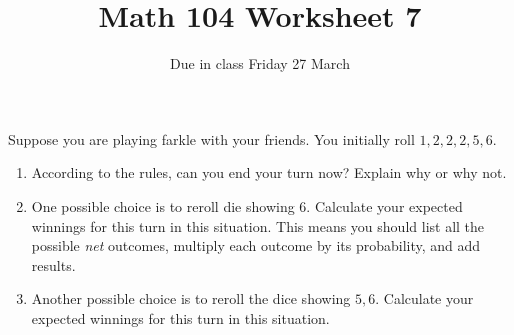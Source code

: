 \documentclass[12pt]{article}
\author{}\date{Due in class Friday 27 March}
\title{Math 104 Worksheet 7}\author{}
\begin{document}
\maketitle
\thispagestyle{empty}

\item Suppose you are playing farkle with your
friends. You initially roll $1,2,2,2,5,6$.
\begin{enumerate}
\item According to the rules, can you end your turn now?
Explain why or why not.
\item One possible choice is to reroll die showing 6.
Calculate your expected winnings for this turn in
this situation.
This means you should list all the possible {\em net}
outcomes, multiply each outcome by its probability,
and add results.
\item Another possible choice is to reroll
the dice showing $5,6$.
Calculate your expected winnings for this turn in
this situation.
\end{enumerate}
\end{document}
